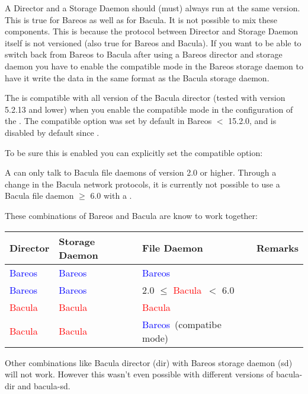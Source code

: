 A Director and a Storage Daemon should (must) always run at the same version.
This is true for Bareos as well as for Bacula.
It is not possible to mix these components.
This is because the protocol between Director and Storage Daemon itself is not versioned (also true for Bareos and Bacula).
If you want to be able to switch back from Bareos to Bacula after using a Bareos director and storage daemon
you have to enable the compatible mode in the Bareos storage daemon to have it write the data in the same
format as the Bacula storage daemon.

The \bareosFd is compatible with all version of the Bacula director (tested with version 5.2.13 and lower)
when you enable the compatible mode in the configuration of the \bareosFd.
The compatible option was set by default in Bareos $<$ 15.2.0, and is disabled by default since
.

To be sure this is enabled you can explicitly set the compatible option:


A \bareosDir can only talk to Bacula file daemons of version 2.0 or higher.
Through a change in the Bacula network protocols,
it is currently not possible to use a Bacula file daemon $\ge$ 6.0 with a \bareosDir.


\newcommand{\bareoscolor}{\textcolor{blue}{Bareos\ }}
\newcommand{\baculacolor}{\textcolor{red}{Bacula\ }}


These combinations of Bareos and Bacula are know to work together:

\begin{tabular}[h]{|l|l|l|l|}
  \hline
  \textbf{Director} & \textbf{Storage Daemon} & \textbf{File Daemon} & \textbf{Remarks} \\
  \hline
  \hline
  \bareoscolor & \bareoscolor & \bareoscolor & \\
  \hline
  \bareoscolor & \bareoscolor & 2.0 $\leq$ \baculacolor $<$ 6.0 & \\
  \hline
  \baculacolor & \baculacolor & \baculacolor & \\
  \hline
  \baculacolor & \baculacolor & \bareoscolor (compatibe mode) & \\
  \hline
\end{tabular}

Other combinations like Bacula director (dir) with Bareos storage daemon (sd) will not work. However this wasn't even possible with different versions of bacula-dir and bacula-sd.


